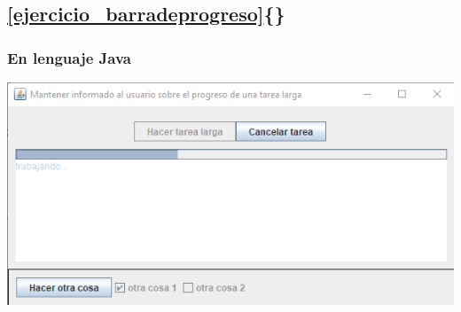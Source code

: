 \documentclass[spanish,12pt,a4paper,final,oneside]{book}
\begin{document}










\vspace{2cm}
\subsection*{\ref{ejercicio_barradeprogreso}\{\}}
\vspace{0.5cm}
\subsubsection*{En lenguaje Java} \lstset{language=Java} 
\includegraphics[width=\textwidth]{BarraDeProgreso - pantallazo - Java}




\end{document}
